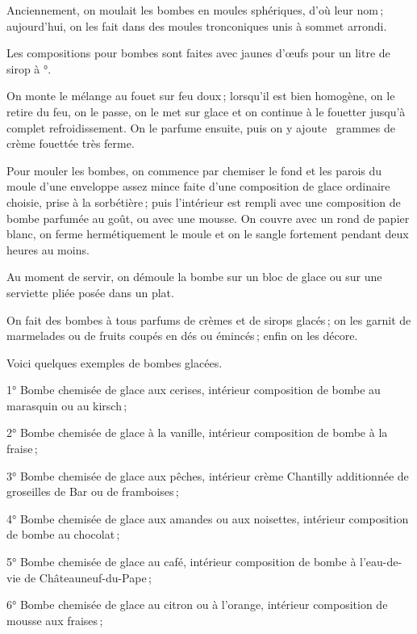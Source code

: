 Anciennement, on moulait les bombes en moules sphériques, d'où leur nom ;
aujourd'hui, on les fait dans des moules tronconiques unis à sommet arrondi.

Les compositions pour bombes sont faites avec {\mmm} jaunes d'œufs pour
un litre de sirop à {\mmm}°.

On monte le mélange au fouet sur feu doux ; lorsqu'il est bien homogène, on le
retire du feu, on le passe, on le met sur glace et on continue à le fouetter
jusqu'à complet refroidissement. On le parfume ensuite, puis on y ajoute
{\mmm} {\mmm} grammes de crème fouettée très ferme.

\medskip

Pour mouler les bombes, on commence par chemiser le fond et les parois du moule
d'une enveloppe assez mince faite d'une composition de glace ordinaire choisie,
prise à la sorbétière ; puis l'intérieur est rempli avec une composition de
bombe parfumée au goût, ou avec une mousse. On couvre avec un rond de papier
blanc, on ferme hermétiquement le moule et on le sangle fortement pendant deux
heures au moins.

Au moment de servir, on démoule la bombe sur un bloc de glace ou sur une
serviette pliée posée dans un plat.

\medskip

On fait des bombes à tous parfums de crèmes et de sirops glacés ; on les garnit
de marmelades ou de fruits coupés en dés ou émincés ; enfin on les décore.

\medskip

Voici quelques exemples de bombes glacées.

\medskip

1° Bombe chemisée de glace aux cerises, intérieur composition de bombe au
marasquin ou au kirsch ;

2° Bombe chemisée de glace à la vanille, intérieur composition de bombe à la
fraise ;

3° Bombe chemisée de glace aux pêches, intérieur crème Chantilly additionnée de
groseilles de Bar ou de framboises ;

4° Bombe chemisée de glace aux amandes ou aux noisettes, intérieur composition
de bombe au chocolat ;

5° Bombe chemisée de glace au café, intérieur composition de bombe
à l'eau-de-vie de Châteauneuf-du-Pape ;

6° Bombe chemisée de glace au citron ou à l'orange, intérieur composition de
mousse aux fraises ;

